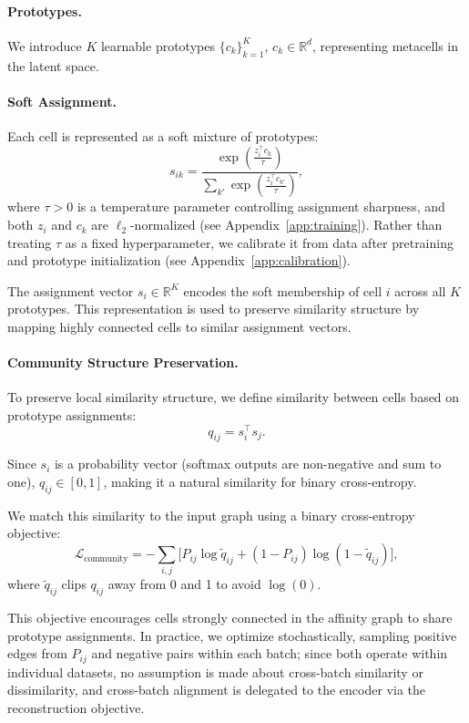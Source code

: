 \paragraph{Prototypes.}
We introduce $K$ learnable prototypes $\{c_k\}_{k=1}^K$, $c_k \in \mathbb{R}^d$, representing metacells in the latent space.

\paragraph{Soft Assignment.}
Each cell is represented as a soft mixture of prototypes:
\[
s_{ik} =
\frac{\exp\left( \frac{z_i^\top c_k}{\tau} \right)}
{\sum_{k'} \exp\left( \frac{z_i^\top c_{k'}}{\tau} \right)},
\]
where $\tau > 0$ is a temperature parameter controlling assignment sharpness, and both $z_i$ and $c_k$ are $\ell_2$-normalized (see Appendix~\ref{app:training}). Rather than treating $\tau$ as a fixed hyperparameter, we calibrate it from data after pretraining and prototype initialization (see Appendix~\ref{app:calibration}).

The assignment vector $s_i \in \mathbb{R}^K$ encodes the soft membership of cell $i$ across all $K$ prototypes. This representation is used to preserve similarity structure by mapping highly connected cells to similar assignment vectors.

\paragraph{Community Structure Preservation.}
To preserve local similarity structure, we define similarity between cells based on prototype assignments:
\[
q_{ij} = s_i^\top s_j.
\]

Since $s_i$ is a probability vector (softmax outputs are non-negative and sum to one), $q_{ij} \in [0,1]$, making it a natural similarity for binary cross-entropy.

We match this similarity to the input graph using a binary cross-entropy objective:
\[
\mathcal{L}_{\text{community}}
=
-\sum_{i,j}
\Big[
P_{ij}\log \tilde q_{ij}
+
(1-P_{ij})\log(1-\tilde q_{ij})
\Big],
\]
where $\tilde q_{ij}$ clips $q_{ij}$ away from 0 and 1 to avoid $\log(0)$.

This objective encourages cells strongly connected in the affinity graph to share prototype assignments. In practice, we optimize stochastically, sampling positive edges from $P_{ij}$ and negative pairs within each batch; since both operate within individual datasets, no assumption is made about cross-batch similarity or dissimilarity, and cross-batch alignment is delegated to the encoder via the reconstruction objective.

